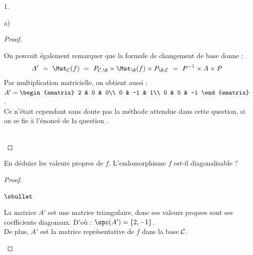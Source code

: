 \documentclass[11pt]{article}%
\begin{document}
\begin{noliste}{1.}
\begin{noliste}{a)}
\begin{proof}
      
      \begin{remark}
        On pouvait également remarquer que la formule de changement de 
        base donne :
        \[
          A' \ = \ \Mat_{\cal C}(f) \ = \ P_{{\cal C}, \B} \times 
          \Mat_\B(f) \times P_{\B,{\cal C}} \ = \ P^{-1} \times 
          A \times P
        \]
        Par multiplication matricielle, on obtient aussi : 
        $A' = 
        \begin{smatrix}
          2 & 0 & 0\\
          0 & -1 & 1\\
          0 & 0 & -1
        \end{smatrix}$.\\[.2cm]
        Ce n'était cependant sans doute pas la méthode attendue dans 
	cette question, si on se fie à l'énoncé de la question 
	. 
      \end{remark}~\\[-1.4cm]
    \end{proof}

    
    \item En déduire les valeurs propres de $f$. L'endomorphisme $f$
    est-il diagonalisable ?
    
    \begin{proof}~
      \begin{noliste}{$\sbullet$}
	\item La matrice $A'$ est une matrice triangulaire, donc ses 
	valeurs propres sont ses coefficients diagonaux. D'où :
	$\spc(A') = \{2,-1\}$.\\
	De plus, $A'$ est la matrice représentative de $f$ dans la base 
	${\cal C}$.
	

\end{noliste}
\end{proof}
\end{noliste}
\end{noliste}
\end{document}
